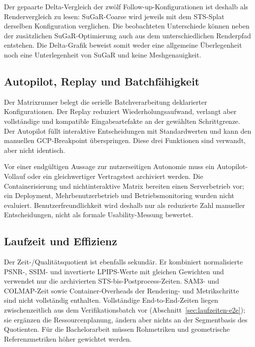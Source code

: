 Der gepaarte Delta-Vergleich der zwölf Follow-up-Konfigurationen ist deshalb
als Rendervergleich zu lesen: SuGaR-Coarse wird jeweils mit dem STS-Splat
derselben Konfiguration verglichen. Die beobachteten Unterschiede können neben
der zusätzlichen SuGaR-Optimierung auch aus dem unterschiedlichen Renderpfad
entstehen. Die Delta-Grafik beweist somit weder eine allgemeine Überlegenheit
noch eine Unterlegenheit von SuGaR und keine Meshgenauigkeit.

\subsection{Autopilot, Replay und Batchfähigkeit}

Der Matrixrunner belegt die serielle Batchverarbeitung deklarierter
Konfigurationen. Der Replay reduziert Wiederholungsaufwand, verlangt aber
vollständige und kompatible Eingabeartefakte an der gewählten Schrittgrenze.
Der Autopilot füllt interaktive Entscheidungen mit Standardwerten und kann den
manuellen GCP-Breakpoint überspringen. Diese drei Funktionen sind verwandt,
aber nicht identisch.

Vor einer endgültigen Aussage zur nutzerseitigen Autonomie muss ein
Autopilot-Vollauf oder ein gleichwertiger Vertragstest archiviert werden. Die
Containerisierung und nichtinteraktive Matrix bereiten einen Serverbetrieb vor;
ein Deployment, Mehrbenutzerbetrieb und Betriebsmonitoring wurden nicht
evaluiert. Benutzerfreundlichkeit wird deshalb nur als reduzierte Zahl
manueller Entscheidungen, nicht als formale Usability-Messung bewertet.

\subsection{Laufzeit und Effizienz}

Der Zeit-/Qualitätsquotient ist ebenfalls sekundär. Er kombiniert normalisierte
PSNR-, SSIM- und invertierte LPIPS-Werte mit gleichen Gewichten und verwendet
nur die archivierten STS-bis-Postprocess-Zeiten. SAM3- und COLMAP-Zeit sowie
Container-Overheads der Rendering- und Metrikschritte sind nicht vollständig
enthalten. Vollständige End-to-End-Zeiten liegen zwischenzeitlich aus dem
Verifikationsbatch  vor
(Abschnitt~\ref{sec:laufzeiten-e2e}); sie ergänzen die Ressourcenplanung,
ändern aber nichts an der Segmentbasis des Quotienten. Für die
Bachelorarbeit müssen Rohmetriken und geometrische
Referenzmetriken höher gewichtet werden.

